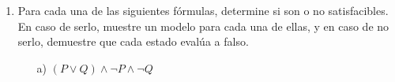 \documentclass[letterpaper,11pt]{article}
\begin{document}
\begin{enumerate}
\begin{itemize}
        \item[b)] $(A \land B) → Q ≡ (A → Q) \lor (B → Q)$ 
        \begin{proof}
            \begin{align*}
                (A \land B) → Q 
                ≡& \; \neg (A \land B) \lor Q
                && \text{equivalencia de $→$} \\ 
                ≡& \; (\neg A \lor \neg B) \lor Q
                && \text{De Morgan} \\
                ≡& \; (\neg A \lor \neg B) \lor (Q \lor Q)
                && \text{idempotencia} \\ 
                ≡& \; (\neg A \lor Q) \lor (\neg B \lor Q)
                && \text{distributividad} \\
                ≡& \; (A → Q) \lor (B → Q)
                && \text{equivalencia de $→$}
            \end{align*}
        \end{proof}

        \item[c)] $(A \land B) → Q ≡ A → (B → Q)$
        \begin{proof}
            \begin{align*}
                (A \land B) → Q 
                ≡& \; \neg (A \land B) \lor Q
                && \text{equivalencia de $→$} \\ 
                ≡& \; (\neg A \lor \neg B) \lor Q
                && \text{De Morgan} \\ 
                ≡& \; \neg A \lor (\neg B \lor Q)
                && \text{asociatividad} \\ 
                ≡& \; A → (B → Q)
                && \text{equivalencia de $→$}
            \end{align*}
        \end{proof}
    \end{itemize}

    \item Para cada una de las siguientes fórmulas, determine si son o no 
    satisfacibles. En caso de serlo, muestre un modelo para cada una de ellas,
    y en caso de no serlo, demuestre que cada estado evalúa a falso.

    \begin{itemize}
        \item[a)] $(P \lor Q) \land \neg P \land \neg Q$ 


\end{itemize}
\end{enumerate}
\end{document}
